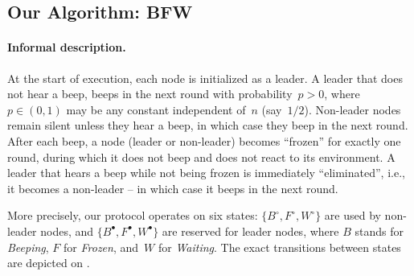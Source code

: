 \documentclass{article}
\newcommand{\rnote}[1]{{\color{myred} ({\bf Robin:} #1)}}
\newcommand{\inote}[1]{{\color{blue} ({\bf Isa:} #1)}}
\newcommand{\lead}{\bullet}
\newcommand{\nlead}{\circ}
\newcommand{\protocolname}{BFW\xspace}
\begin{document}





\subsection{Our Algorithm: \protocolname} \label{sec:algorithm}

\paragraph{Informal description.} At the start of execution, each node is initialized as a leader. 
A leader that does not hear a beep, beeps in the next round with probability~$p > 0$, where~$p \in (0,1)$ may be any constant independent of~$n$ (say~$1/2$).
Non-leader nodes remain silent unless they hear a beep, in which case they beep in the next round.
After each beep, a node (leader or non-leader) becomes ``frozen'' for exactly one round, during which it does not beep and does not react to its environment.
A leader that hears a beep while not being frozen is immediately ``eliminated'', i.e., it becomes a non-leader -- in which case it beeps in the next round.

More precisely, our protocol operates on six states: $\{B^\nlead, F^\nlead, W^\nlead\}$ are used by non-leader nodes, and $\{B^\lead, F^\lead, W^\lead\}$ are reserved for leader nodes, where $B$ stands for {\em Beeping}, $F$ for {\em Frozen}, and~$W$ for {\em Waiting}.
The exact transitions between states are depicted on .
\end{document}
